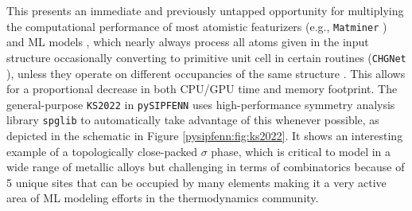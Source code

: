 This presents an immediate and previously untapped opportunity for multiplying the computational performance of most atomistic featurizers (e.g., \texttt{Matminer} \cite{Ward2018Matminer:Mining}) and ML models \cite{Ward2017, Chen2019GraphCrystals, Jha2019IRNet, Krajewski2022ExtensibleNetworks, Choudhary2021AtomisticPredictions, Deng2023CHGNetModelling, Davariashtiyani2023FormationRepresentation, Schmidt2023Machine-Learning-AssistedMaterials, Banik2024EvaluatingMaterials, Hu2021Atomtransmachine:Learning}, which nearly always process all atoms given in the input structure occasionally converting to primitive unit cell in certain routines (\texttt{CHGNet} \cite{Deng2023CHGNetModelling}), unless they operate on different occupancies of the same structure \cite{Crivello2022SupervisedExample}. This allows for a proportional decrease in both CPU/GPU time and memory footprint. The general-purpose \texttt{KS2022} in \texttt{pySIPFENN} uses high-performance symmetry analysis library \texttt{spglib} \cite{Togo2018Spglib:Search} to automatically take advantage of this whenever possible, as depicted in the schematic in Figure \ref{pysipfenn:fig:ks2022}. It shows an interesting example of a topologically close-packed $\sigma$ phase, which is critical to model in a wide range of metallic alloys \cite{Joubert2008CrystalPhase} but challenging in terms of combinatorics because of 5 unique sites that can be occupied by many elements \cite{Choi2019ADesign, Ostrowska2020ThermodynamicW} making it a very active area of ML modeling efforts \cite{Crivello2022SupervisedExample, Zha2024ApplyingEnergy} in the thermodynamics community.

